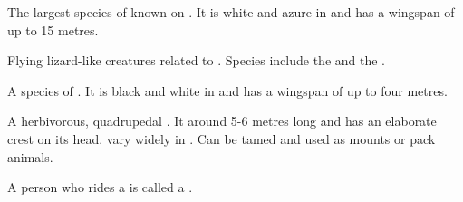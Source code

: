 \begin{gloss}
\begin{comment}
\paragraph{\quilrai}
\end{comment}
\gitem[\quilrais]{\quilrai}
The largest species of  known on \Miith{}.
It is white and azure in \colour and has a wingspan of up to 15 metres. 









\begin{comment}
\paragraph{pteran}
\end{comment}
Flying lizard-like creatures related to . 
Species include the \ravcor{} and the \quilrai. 










\begin{comment}
\paragraph{\ravcor}
\end{comment}
\gitem{\ravcor}
A species of . 
It is black and white in \colour and has a wingspan of up to four metres. 







\begin{comment}
\paragraph{\relc}
\end{comment}
\gitem[\relcs]{\relc}
A herbivorous, quadrupedal . 
It around 5-6 metres long and has an elaborate crest on its head. 
\Relcs{} vary widely in \colour. 
Can be tamed and used as mounts or pack animals. 

A person who rides a \relc{} is called a \relcer{}. 


\end{gloss}
